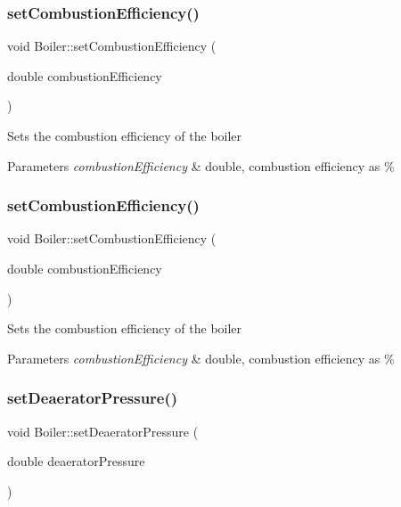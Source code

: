\subsubsection{\texorpdfstring{set\+Combustion\+Efficiency()}{setCombustionEfficiency()}\hspace{0.1cm}{\footnotesize\ttfamily [2/3]}}
{\footnotesize\ttfamily void Boiler\+::set\+Combustion\+Efficiency (\begin{DoxyParamCaption}\item[{double}]{combustion\+Efficiency }\end{DoxyParamCaption})}

Sets the combustion efficiency of the boiler 
\begin{DoxyParams}{Parameters}
{\em combustion\+Efficiency} & double, combustion efficiency as \% \\
\hline
\end{DoxyParams}
\mbox{\label{class_boiler_abef6bc48101f98f0650cb07fb1d51f74}} 
\subsubsection{\texorpdfstring{set\+Combustion\+Efficiency()}{setCombustionEfficiency()}\hspace{0.1cm}{\footnotesize\ttfamily [3/3]}}
{\footnotesize\ttfamily void Boiler\+::set\+Combustion\+Efficiency (\begin{DoxyParamCaption}\item[{double}]{combustion\+Efficiency }\end{DoxyParamCaption})}

Sets the combustion efficiency of the boiler 
\begin{DoxyParams}{Parameters}
{\em combustion\+Efficiency} & double, combustion efficiency as \% \\
\hline
\end{DoxyParams}
\mbox{\label{class_boiler_a56f422254606ebba1248ae0b4f8f0215}} 
\subsubsection{\texorpdfstring{set\+Deaerator\+Pressure()}{setDeaeratorPressure()}\hspace{0.1cm}{\footnotesize\ttfamily [1/3]}}
{\footnotesize\ttfamily void Boiler\+::set\+Deaerator\+Pressure (\begin{DoxyParamCaption}\item[{double}]{deaerator\+Pressure }\end{DoxyParamCaption})}

